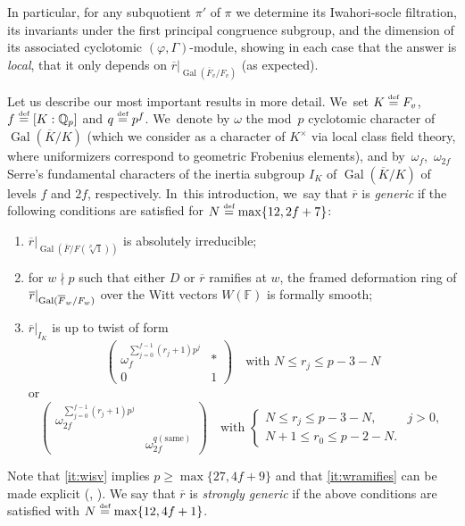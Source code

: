 \documentclass[JEP,XML,SOM,Unicode,NoFloatCountersInSection, NoEqCountersInSection,published]{cedram}
\let\ovl\overline
\newcommand{\defeq}{\stackrel{\textrm{\tiny{\upshape{def}}}}{=}}
\newcommand{\F}{\mathbb{F}}
\newcommand{\Qp}{\mathbb{Q}_{p}}
\newcommand{\rbar}{\overline{r}}
\DeclareMathOperator{\Gal}{Gal}
\let\vp\varphi
\theoremstyle{plain}
\theoremstyle{definition}
\begin{document}
In particular, for any subquotient $\pi'$ of $\pi$ we determine its Iwahori-socle filtration, its invariants under the first principal congruence subgroup, and the dimension of its associated cyclotomic $(\vp,\Gamma)$-module, showing in each case that the answer is \emph{local}, \ie that it only depends on $\rbar\vert_{\Gal(\ovl F_v/F_v)}$ (as expected).

Let us describe our most important results in more detail. We~set $K\defeq F_v$, $f\defeq [K:\Qp]$ and $q\defeq p^f$. We~denote by $\omega$ the mod~$p$ cyclotomic character of $\Gal(\ovl K/K)$ (which we consider as a character of $K^\times$ via local class field theory, where uniformizers correspond to geometric Frobenius elements), and by~$\omega_{f}$,~$\omega_{2f}$ Serre's fundamental characters of the inertia subgroup $I_K$ of $\Gal(\ovl K/K)$ of levels $f$ and $2f$, respectively. In~this introduction, we~say that $\rbar$ is \emph{generic} if the following conditions are satisfied for $N \defeq \max\{12,2f+7\}$:
\begin{enumerate}
\item $\rbar\vert_{\Gal(\overline F/F(\sqrt[p]{1}))}$ is absolutely irreducible;
\item\label{it:wramifies} for $w\!\nmid\! p$ such that either $D$ or $\rbar$ ramifies at $w$, the framed deformation ring of $\rbar\vert_{{\rm Gal}(\overline F_w/F_w)}$ over the Witt vectors $W(\F)$ is formally smooth;
\item\label{it:wisv}$\rbar\vert_{I_{K}}$ is up to twist of form
\begin{equation*}
\begin{pmatrix}\omega_f^{\sum_{j=0}^{f-1} (r_j+1) p^j}&*\\0&1\end{pmatrix}\quad\text{with\ }N \le r_j \le p-3-N
\end{equation*}
or
\begin{equation*}
\begin{pmatrix}\omega_{2f}^{\sum_{j=0}^{f-1} (r_j+1) p^j} & \\ & \omega_{2f}^{q(\text{same})}\end{pmatrix}\quad \text{with\ }
\begin{cases}
N \le r_j \le p-3-N, & j>0, \\
N+1 \le r_0 \le p-2-N.
\end{cases}
\end{equation*}
\end{enumerate}
Note that \ref{it:wisv} implies $p\geq \max\{27,4f+9\}$ and that \ref{it:wramifies} can be made explicit (\cite{Shotton}, \cite[Rem.\,8.1.1]{BHHMS1}).
{We say that $\rbar$ is \emph{strongly generic} if the above conditions are satisfied with $N \defeq \max\{12,4f+1\}$.}
\end{document}
